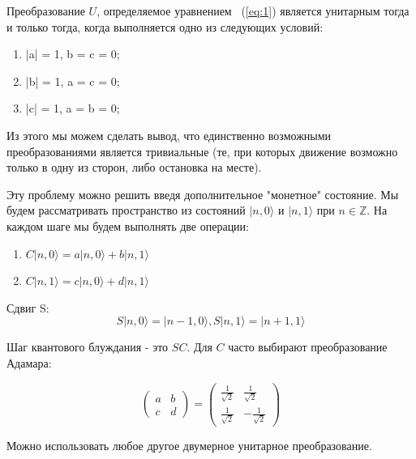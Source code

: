 \documentclass[a4paper]{report}
\begin{document}
Преобразование $U$, определяемое уравнением ~(\ref {eq:1}) является унитарным тогда и только тогда, когда выполняется одно из следующих условий:

\begin{enumerate}
     \item |a|  =  1, b = c = 0;
     \item |b|  =  1, a = c = 0;
     \item |c|  =  1, a = b = 0;
\end{enumerate}

Из этого мы можем сделать вывод, что единственно возможными преобразованиями является тривиальные (те, при которых движение возможно только в одну из сторон, либо остановка на месте).

Эту проблему можно решить введя дополнительное "монетное" состояние. Мы будем рассматривать пространство из состояний  $|n, 0\rangle$ и $|n, 1\rangle$  при $n  \in \mathbb{Z} $. На каждом шаге мы будем выполнять две операции:


\begin{enumerate} \label{qbit_transformation}
     \item $C|n, 0\rangle = a|n, 0\rangle + b|n, 1\rangle$
     \item $C|n, 1\rangle = c|n, 0\rangle + d|n, 1\rangle$
\end{enumerate}

Сдвиг S:
\begin{equation} \label{coin_transformation}
    S|n, 0\rangle = |n - 1, 0\rangle, S|n, 1\rangle = |n + 1, 1\rangle
\end{equation}

Шаг квантового блуждания - это $SC$. Для $C$ часто выбирают преобразование Адамара:

\begin{equation} \label{eq:1}
\begin{pmatrix}
  a& b \\
  c& d
\end{pmatrix}
=
\begin{pmatrix}
  \frac{1}{\sqrt{2}} & \frac{1}{\sqrt{2}} \\
  \frac{1}{\sqrt{2}}& -\frac{1}{\sqrt{2}}
\end{pmatrix}
\end{equation}

Можно использовать любое другое двумерное унитарное преобразование.
\end{document}
